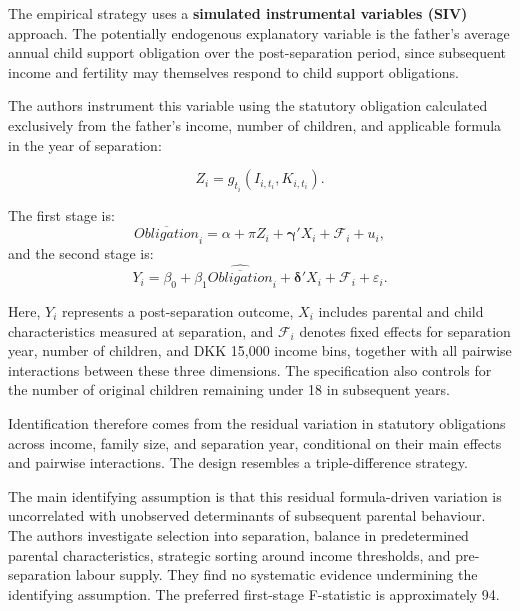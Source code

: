 \documentclass{article}
\begin{document}
The empirical strategy uses a \textbf{simulated instrumental variables (SIV)} approach. The potentially endogenous explanatory variable is the father's average annual child support obligation over the post-separation period, since subsequent income and fertility may themselves respond to child support obligations.

The authors instrument this variable using the statutory obligation calculated exclusively from the father's income, number of children, and applicable formula in the year of separation:

\[
Z_i=g_{t_i}(I_{i,t_i},K_{i,t_i}).
\]

The first stage is:
\[
\overline{Obligation}_i
=\alpha+\pi Z_i+\boldsymbol{\gamma}'X_i
+\mathcal{F}_i+u_i,
\]
and the second stage is:
\[
Y_i=\beta_0+
\beta_1\widehat{\overline{Obligation}}_i+
\boldsymbol{\delta}'X_i+\mathcal{F}_i+\varepsilon_i.
\]

Here, $Y_i$ represents a post-separation outcome, $X_i$ includes parental and child characteristics measured at separation, and $\mathcal{F}_i$ denotes fixed effects for separation year, number of children, and DKK 15,000 income bins, together with all pairwise interactions between these three dimensions. The specification also controls for the number of original children remaining under 18 in subsequent years.

Identification therefore comes from the residual variation in statutory obligations across income, family size, and separation year, conditional on their main effects and pairwise interactions. The design resembles a triple-difference strategy.

The main identifying assumption is that this residual formula-driven variation is uncorrelated with unobserved determinants of subsequent parental behaviour. The authors investigate selection into separation, balance in predetermined parental characteristics, strategic sorting around income thresholds, and pre-separation labour supply. They find no systematic evidence undermining the identifying assumption. The preferred first-stage F-statistic is approximately 94.
\end{document}
